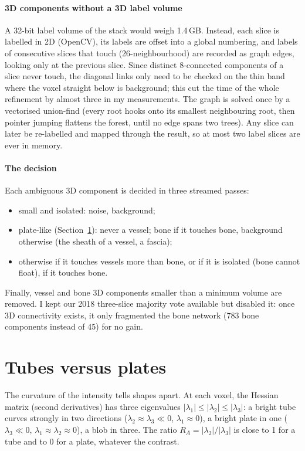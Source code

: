 \paragraph{3D components without a 3D label volume} A 32-bit label volume of the stack would weigh
1.4\,GB. Instead, each slice is labelled in 2D (OpenCV), its labels are offset into a global numbering,
and labels of consecutive slices that touch (26-neighbourhood) are recorded as graph edges, looking only
at the previous slice. Since distinct 8-connected components of a slice never touch, the diagonal links
only need to be checked on the thin band where the voxel straight below is background; this cut the
time of the whole refinement by almost three in my measurements. The graph is solved once by a vectorised union-find (every root hooks onto its
smallest neighbouring root, then pointer jumping flattens the forest, until no edge spans two trees).
Any slice can later be re-labelled and mapped through the result, so at most two label slices are ever
in memory.

\paragraph{The decision} Each ambiguous 3D component is decided in three streamed passes:
\begin{itemize}
  \item small and isolated: noise, background;
  \item plate-like (Section~\ref{sec:tubularity}): never a vessel; bone if it touches bone,
        background otherwise (the sheath of a vessel, a fascia);
  \item otherwise \vessel{} if it touches vessels more than bone, or if it is isolated (bone cannot
        float), \bone{} if it touches bone.
\end{itemize}
Finally, vessel and bone 3D components smaller than a minimum volume are removed. I kept our 2018
three-slice majority vote available but disabled it: once 3D connectivity exists, it only fragmented the
bone network (783 bone components instead of 45) for no gain.

\section{Tubes versus plates}
\label{sec:tubularity}

The curvature of the intensity tells shapes apart. At each voxel, the Hessian matrix (second
derivatives) has three eigenvalues $|\lambda_1| \le |\lambda_2| \le |\lambda_3|$: a bright tube curves
strongly in two directions ($\lambda_2 \approx \lambda_3 \ll 0$, $\lambda_1 \approx 0$), a bright plate in
one ($\lambda_3 \ll 0$, $\lambda_1 \approx \lambda_2 \approx 0$), a blob in three. The ratio
$R_A = |\lambda_2| / |\lambda_3|$ is close to 1 for a tube and to 0 for a plate, whatever the contrast.


